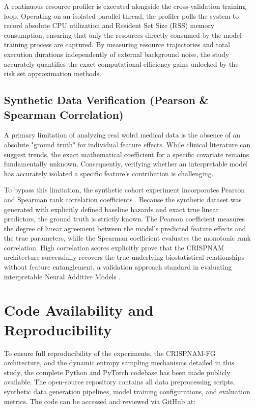 \documentclass[a4paper,twoside,12pt]{report}
\begin{document}
A continuous resource profiler is executed alongside the cross-validation training loop. Operating on an isolated parallel thread, the profiler polls the system to record absolute CPU utilization and Resident Set Size (RSS) memory consumption, ensuring that only the resources directly consumed by the model training process are captured. By measuring resource trajectories and total execution durations independently of external background noise, the study accurately quantifies the exact computational efficiency gains unlocked by the risk set approximation methods.

\subsection{Synthetic Data Verification (Pearson \& Spearman Correlation)}
A primary limitation of analyzing real wolrd medical data is the absence of an absolute "ground truth" for individual feature effects. While clinical literature can suggest trends, the exact mathematical coefficient for a specific covariate remains fundamentally unknown. Consequently, verifying whether an interpretable model has accurately isolated a specific feature's contribution is challenging.

To bypass this limitation, the synthetic cohort experiment incorporates Pearson and Spearman rank correlation coefficients \citep{rosner2015fundamentals}. Because the synthetic dataset was generated with explicitly defined baseline hazards and exact true linear predictors, the ground truth is strictly known. The Pearson coefficient measures the degree of linear agreement between the model's predicted feature effects and the true parameters, while the Spearman coefficient evaluates the monotonic rank correlation. High correlation scores explicitly prove that the CRISPNAM architecture successfully recovers the true underlying biostatistical relationships without feature entanglement, a validation approach standard in evaluating interpretable Neural Additive Models \citep{agarwal2021neural}.

\section{Code Availability and Reproducibility}

To ensure full reproducibility of the experiments, the CRISPNAM-FG architecture, and the dynamic entropy sampling mechanisms detailed in this study, the complete Python and PyTorch codebase has been made publicly available. The open-source repository contains all data preprocessing scripts, synthetic data generation pipelines, model training configurations, and evaluation metrics. The code can be accessed and reviewed via GitHub at: 
\end{document}
